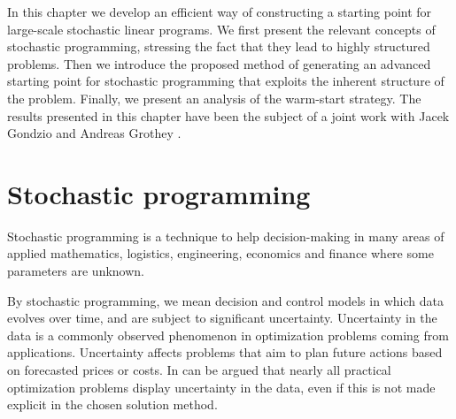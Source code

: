 
%
%
\label{ch:Warmstart}

In this chapter we develop an efficient way of constructing a 
starting point for large-scale stochastic linear programs.
We first present the relevant
concepts of stochastic programming, stressing the fact that
they lead to highly structured problems.
Then we introduce 
the proposed method of generating an advanced starting point for 
stochastic programming that exploits the inherent structure of the
problem. Finally, we present an analysis of the warm-start strategy.
The results presented in this chapter have been the subject
of a joint work with Jacek Gondzio and Andreas Grothey
\cite{ColomboGondzioGrothey06}. 


%
%
\section{Stochastic programming}

Stochastic programming \cite{BirgeLouveaux,KallWallace}
is a technique to help decision-making 
in many areas of applied mathematics, logistics, engineering, economics and 
finance where some parameters are unknown.


By stochastic programming, we mean decision and control models in which 
data evolves over time, and are subject to significant uncertainty.
%
Uncertainty in the data is a commonly observed phenomenon in
optimization problems coming from applications. Uncertainty
affects problems that aim to plan future actions based on forecasted
prices or costs. In can be argued that nearly all practical
optimization problems display uncertainty in the data, even if this is
not made explicit in the chosen solution method. 

